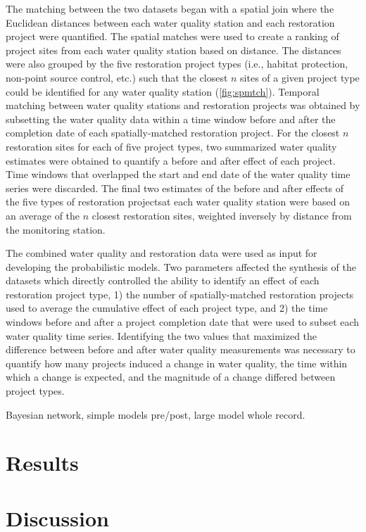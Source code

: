 \documentclass[]{article}
\begin{document}
The matching between the two datasets began with a spatial join where
the Euclidean distances between each water quality station and each
restoration project were quantified. The spatial matches were used to
create a ranking of project sites from each water quality station based
on distance. The distances were also grouped by the five restoration
project types (i.e., habitat protection, non-point source control, etc.)
such that the closest \(n\) sites of a given project type could be
identified for any water quality station (\cref{fig:spmtch}). Temporal
matching between water quality stations and restoration projects was
obtained by subsetting the water quality data within a time window
before and after the completion date of each spatially-matched
restoration project. For the closest \(n\) restoration sites for each of
five project types, two summarized water quality estimates were obtained
to quantify a before and after effect of each project. Time windows that
overlapped the start and end date of the water quality time series were
discarded. The final two estimates of the before and after effects of
the five types of restoration projectsat each water quality station were
based on an average of the \(n\) closest restoration sites, weighted
inversely by distance from the monitoring station.

The combined water quality and restoration data were used as input for
developing the probabilistic models. Two parameters affected the
synthesis of the datasets which directly controlled the ability to
identify an effect of each restoration project type, 1) the number of
spatially-matched restoration projects used to average the cumulative
effect of each project type, and 2) the time windows before and after a
project completion date that were used to subset each water quality time
series. Identifying the two values that maximized the difference between
before and after water quality measurements was necessary to quantify
how many projects induced a change in water quality, the time within
which a change is expected, and the magnitude of a change differed
between project types.

Bayesian network, simple models pre/post, large model whole record.

\section{Results}\label{results}

\section{Discussion}\label{discussion}
\end{document}
